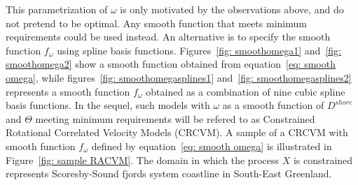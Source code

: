 \documentclass[11pt]{article}
\newcommand {\1}{\mathbb{1}}
\begin{document}
This parametrization of $\omega$ is only motivated by the observations above, and do not pretend to be optimal. Any smooth function that meets minimum requirements could be used instead. An alternative is to specify the smooth function $f_{\omega}$ using spline basis functions. Figures~\ref{fig: smoothomega1} and~\ref{fig: smoothomega2} show a smooth function obtained from equation~\ref{eq: smooth omega}, while figures~\ref{fig: smoothomegasplines1} and~\ref{fig: smoothomegasplines2}  represents a smooth function $f_{\omega}$ obtained as a combination of nine cubic spline basis functions. In the sequel, such models with $\omega$ as a smooth function of $D^{shore}$ and $\Theta$ meeting minimum requirements will be refered to as Constrained Rotational Correlated Velocity Models (CRCVM). A sample of a CRCVM with smooth function $f_{\omega}$ defined by equation~\ref{eq: smooth omega} is illustrated in Figure~\ref{fig: sample RACVM}. The domain in which the process $X$ is constrained represents Scoresby-Sound fjords system coastline in South-East Greenland.
\end{document}

